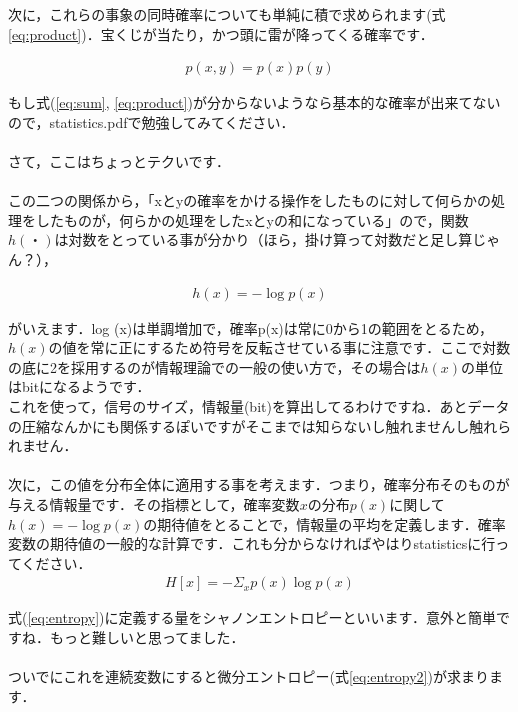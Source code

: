 \documentclass[11pt,a4paper]{ujreport}
\begin{document}
次に，これらの事象の同時確率についても単純に積で求められます(式\ref{eq:product})．宝くじが当たり，かつ頭に雷が降ってくる確率です．

\begin{eqnarray}
\label{eq:product}
p(x,y) = p(x)p(y)
\end{eqnarray}

もし式(\ref{eq:sum}, \ref{eq:product})が分からないようなら基本的な確率が出来てないので，statistics.pdfで勉強してみてください．\\
\\
さて，ここはちょっとテクいです．\\
\\
この二つの関係から，「xとyの確率をかける操作をしたものに対して何らかの処理をしたものが，何らかの処理をしたxとyの和になっている」ので，関数$h(・)$は対数をとっている事が分かり（ほら，掛け算って対数だと足し算じゃん？），

\begin{eqnarray}
h(x) = -\log p(x)
\end{eqnarray}

がいえます．log (x)は単調増加で，確率p(x)は常に0から1の範囲をとるため，$h(x)$の値を常に正にするため符号を反転させている事に注意です．ここで対数の底に2を採用するのが情報理論での一般の使い方で，その場合は$h(x)$の単位はbitになるようです．\\

これを使って，信号のサイズ，情報量(bit)を算出してるわけですね．あとデータの圧縮なんかにも関係するぽいですがそこまでは知らないし触れませんし触れられません．\\
\\

次に，この値を分布全体に適用する事を考えます．つまり，確率分布そのものが与える情報量です．その指標として，確率変数$x$の分布$p(x)$に関して$h(x)=-\log p(x)$の期待値をとることで，情報量の平均を定義します．確率変数の期待値の一般的な計算です．これも分からなければやはりstatisticsに行ってください．\\

\begin{eqnarray}
\label{eq:entropy}
H[x] = - \Sigma_{x} p(x) \log p(x)
\end{eqnarray}

式(\ref{eq:entropy})に定義する量をシャノンエントロピーといいます\cite{prml}．意外と簡単ですね．もっと難しいと思ってました．\\
\\

ついでにこれを連続変数にすると微分エントロピー(式\ref{eq:entropy2})が求まります．
\end{document}
